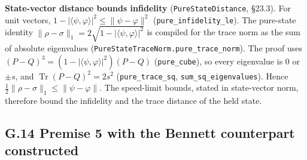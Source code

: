 \documentclass[
]{article}
\begin{document}
\textbf{State-vector distance bounds infidelity}
(\texttt{P\allowbreak{}u\allowbreak{}r\allowbreak{}e\allowbreak{}S\allowbreak{}t\allowbreak{}a\allowbreak{}t\allowbreak{}e\allowbreak{}D\allowbreak{}i\allowbreak{}s\allowbreak{}t\allowbreak{}a\allowbreak{}n\allowbreak{}c\allowbreak{}e},
§23.3). For unit vectors,
\(1-|\langle\psi,\varphi\rangle|^2\le\|\psi-\varphi\|^2\)
(\texttt{p\allowbreak{}u\allowbreak{}r\allowbreak{}e\allowbreak{}\_\allowbreak{}i\allowbreak{}n\allowbreak{}f\allowbreak{}i\allowbreak{}d\allowbreak{}e\allowbreak{}l\allowbreak{}i\allowbreak{}t\allowbreak{}y\allowbreak{}\_\allowbreak{}l\allowbreak{}e}).
The pure-state identity
\(\|\rho-\sigma\|_1=2\sqrt{1-|\langle\psi,\varphi\rangle|^2}\) is
compiled for the trace norm as the sum of absolute eigenvalues
(\texttt{P\allowbreak{}u\allowbreak{}r\allowbreak{}e\allowbreak{}S\allowbreak{}t\allowbreak{}a\allowbreak{}t\allowbreak{}e\allowbreak{}T\allowbreak{}r\allowbreak{}a\allowbreak{}c\allowbreak{}e\allowbreak{}N\allowbreak{}o\allowbreak{}r\allowbreak{}m\allowbreak{}.\allowbreak{}p\allowbreak{}u\allowbreak{}r\allowbreak{}e\allowbreak{}\_\allowbreak{}t\allowbreak{}r\allowbreak{}a\allowbreak{}c\allowbreak{}e\allowbreak{}\_\allowbreak{}n\allowbreak{}o\allowbreak{}r\allowbreak{}m}).
The proof uses \((P-Q)^3=(1-|\langle\psi,\varphi\rangle|^2)(P-Q)\)
(\texttt{pure\_cube}), so every eigenvalue is \(0\) or \(\pm s\), and
\(\operatorname{Tr}(P-Q)^2=2s^2\) (\texttt{pure\_trace\_sq},
\texttt{s\allowbreak{}u\allowbreak{}m\allowbreak{}\_\allowbreak{}s\allowbreak{}q\allowbreak{}\_\allowbreak{}e\allowbreak{}i\allowbreak{}g\allowbreak{}e\allowbreak{}n\allowbreak{}v\allowbreak{}a\allowbreak{}l\allowbreak{}u\allowbreak{}e\allowbreak{}s}).
Hence \(\tfrac12\|\rho-\sigma\|_1\le\|\psi-\varphi\|\). The speed-limit
bounds, stated in state-vector norm, therefore bound the infidelity and
the trace distance of the held state.

\subsection{G.14 Premise 5 with the Bennett counterpart
constructed}\label{g.14-premise-5-with-the-bennett-counterpart-constructed}
\end{document}
